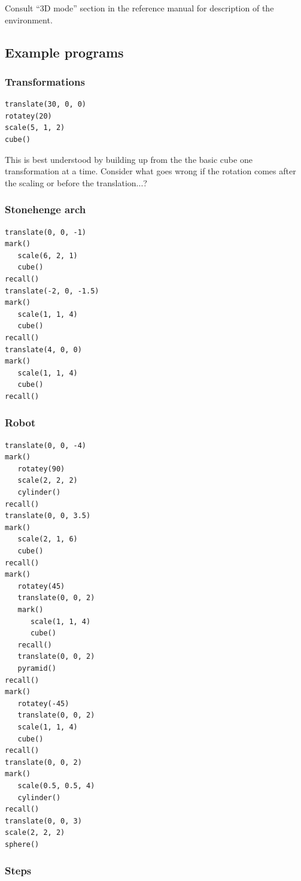 \documentclass[12pt,a4paper,twoside]{article}
\renewcommand{\_}{\texttt{\symbol{95}}}
\begin{document}
Consult ``3D mode'' section in the reference manual for description of the environment.

\subsection{Example programs}

\subsubsection*{Transformations}

\begin{verbatim}
translate(30, 0, 0)
rotatey(20)
scale(5, 1, 2)
cube()
\end{verbatim}

This is best understood by building up from the the basic cube
one transformation at a time.
Consider what goes wrong if the rotation comes after the scaling
or before the translation...?

\subsubsection*{Stonehenge arch}

\begin{verbatim}
translate(0, 0, -1)
mark()
   scale(6, 2, 1)
   cube()
recall()
translate(-2, 0, -1.5)
mark()
   scale(1, 1, 4)
   cube()
recall()
translate(4, 0, 0)
mark()
   scale(1, 1, 4)
   cube()
recall()
\end{verbatim}

\subsubsection*{Robot}

\begin{verbatim}
translate(0, 0, -4)
mark()
   rotatey(90)
   scale(2, 2, 2)
   cylinder()
recall()
translate(0, 0, 3.5)
mark()
   scale(2, 1, 6)
   cube()
recall()
mark()
   rotatey(45)
   translate(0, 0, 2)
   mark()
      scale(1, 1, 4)
      cube()
   recall()
   translate(0, 0, 2)
   pyramid()
recall()
mark()
   rotatey(-45)
   translate(0, 0, 2)
   scale(1, 1, 4)
   cube()
recall()
translate(0, 0, 2)
mark()
   scale(0.5, 0.5, 4)
   cylinder()
recall()
translate(0, 0, 3)
scale(2, 2, 2)
sphere()
\end{verbatim}

\subsubsection*{Steps}
\end{document}
